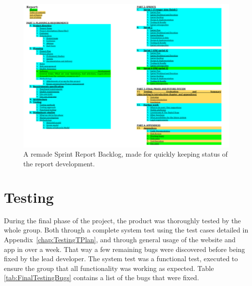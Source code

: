 \begin{figure}[ht!]
\centering
\includegraphics[width=\linewidth]{./FinalSprint/img/ReportBacklog.png}
\caption{A remade Sprint Report Backlog, made for quickly keeping status of the report development. \label{fig:FinalReportBacklog}}
\end{figure}

\section{Testing}
\label{sec:FinalTesting}

During the final phase of the project, the product was thoroughly tested by the whole group. Both through a complete system test using the test cases detailed in Appendix~\ref{chap:TestingTPlan}, and through general usage of the website and app in over a week. That way a few remaining bugs were discovered before being fixed by the lead developer. The system test was a functional test, executed to ensure the group that all functionality was working as expected. Table \ref{tab:FinalTestingBugs} contains a list of the bugs that were fixed.

